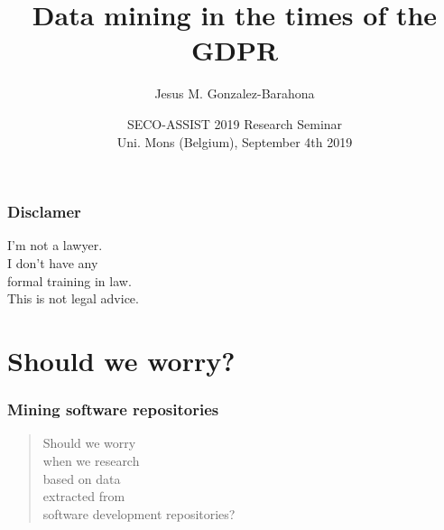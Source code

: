 \documentclass[17pt,aspectratio=169,hyperref={pdfusetitle,colorlinks,allcolors=olive}]{beamer}
\title[Data mining \& GDPR]{Data mining in the times of the GDPR}
\author[Jesus M. Gonzalez-Barahona]{Jesus M. Gonzalez-Barahona}
\institute[URJC]{Universidad Rey Juan Carlos \\
  @jgbarah ~~~~~ \url{https://jgbarah.github.io/presentations}}
\date{SECO-ASSIST 2019 Research Seminar \\ Uni. Mons (Belgium), September 4th 2019}
\begin{document}
\begin{frame}
  \maketitle
\end{frame}






\begin{frame}[fragile]
  \frametitle{Disclamer}

  \begin{center}
  {\Large
    I'm not a lawyer.\\
    \vspace{.8cm}
    I don't have any \\
    formal training in law.\\
    \vspace{.8cm}
    This is not legal advice.\\
  }
  \end{center}
  
\end{frame}

\section{Should we worry?}

\begin{frame}[fragile]
  \frametitle{Mining software repositories}

  \begin{quote}
    Should we worry \\
    when we research \\
    based on data \\
    extracted from \\
    software development repositories?
  \end{quote}

\end{frame}
\end{document}
